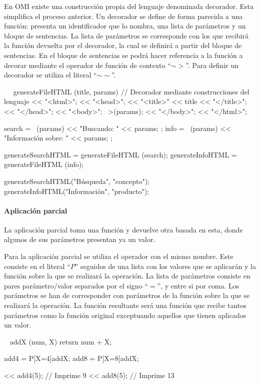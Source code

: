 En OMI existe una construcción propia del lenguaje denominada decorador. Esta simplifica el 
proceso anterior. Un decorador se define de forma parecida a una función: presenta un identificador 
que lo nombra, una lista de parámetros y un bloque de sentencias. La lista de parámetros se corresponde 
con los que recibirá la función devuelta por el decorador, la cual se definirá a partir del 
bloque de sentencias. En el bloque de sentencias se podrá hacer referencia a la función a 
decorar mediante el operador de función de contexto ``$\sim>$''. Para definir un decorador se utiliza
el literal ``$\sim\sim$''. \\

\begin{myverbatim}
   ~~ generateFileHTML (title, params) { // Decorador mediante construcciones del lenguaje
      << "<html>";
      << "<head>";
      << "<title>" << title << "</title>";
      << "</head>";
      << "<body>";
      ~>(params);
      << "</body>";
      << "</html>";
   }
   
   search = ~(params) { << "Buscando: " << params; };
   info = ~(params) { << "Información sobre: " << params; };
   
   generateSearchHTML = generateFileHTML (search);
   generateInfoHTML = generateFileHTML (info);
   
   generateSearchHTML("Búsqueda", "concepto");
   generateInfoHTML("Información", "producto");
\end{myverbatim}
\paragraph{Aplicación parcial}

La aplicación parcial toma una función y devuelve otra basada en esta, donde algunos de sus parámetros presentan ya un valor.

Para la aplicación parcial se utiliza el operador con el mismo nombre. Este consiste en el literal ``$P$'' seguidos de 
una lista con los valores que se aplicarán y la función sobre la que se realizará la operación. La lista de parámetros consiste 
en pares parámetro/valor separados por el signo ``$=$'', y entre si por coma. Los parámetros se han de corresponder con parámetros de
la función sobre la que se realizará la operación. La función resultante será una función que recibe tantos parámetros como la función original
exceptuando aquellos que tienen aplicados un valor. \\ 

\begin{myverbatim}
   ~ addX (num, X) {
      return num + X;
   }
   
   add4 = P[X=4]addX;
   add8 = P[X=8]addX;
   
   << add4(5); // Imprime 9
   << add8(5); // Imprime 13
\end{myverbatim}

